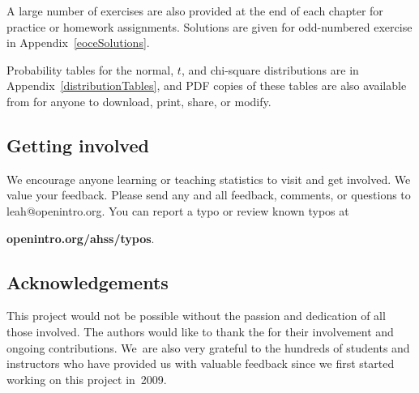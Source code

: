 A large number of exercises are also provided at the end
of each chapter for practice or homework assignments.
Solutions are given for odd-numbered exercise in
Appendix~\ref{eoceSolutions}.


Probability tables for the normal, $t$, and chi-square distributions are in Appendix~\ref{distributionTables}, and PDF copies of these tables are also available from  for anyone to download, print, share, or modify.


\subsection*{Getting involved}
We encourage anyone learning or teaching statistics to visit  and get involved. We value your feedback.  Please send any and all feedback, comments, or questions to leah@openintro.org.  You can report a typo or review known typos at
\begin{center}
    {\color{black}\textbf{openintro.org/ahss/typos}}.
\end{center}


\subsection*{Acknowledgements}

This project would not be possible without the passion
and dedication of all those involved.
The authors would like to thank the
for their involvement and ongoing contributions.
We~are also very grateful to the hundreds of students
and instructors who have provided us with valuable feedback
since we first started working on this project in~2009.




